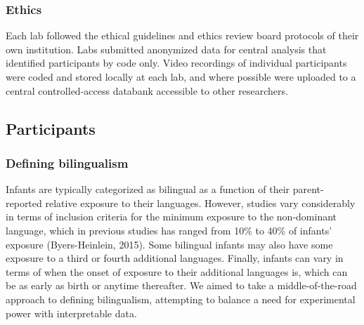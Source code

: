\documentclass[,man,floatsintext]{apa6}
\begin{document}
\hypertarget{ethics}{%
\subsubsection{Ethics}\label{ethics}}

Each lab followed the ethical guidelines and ethics review board protocols of their own institution. Labs submitted anonymized data for central analysis that identified participants by code only. Video recordings of individual participants were coded and stored locally at each lab, and where possible were uploaded to a central controlled-access databank accessible to other researchers.

\hypertarget{participants}{%
\subsection{Participants}\label{participants}}

\hypertarget{defining-bilingualism}{%
\subsubsection{Defining bilingualism}\label{defining-bilingualism}}

Infants are typically categorized as bilingual as a function of their parent-reported relative exposure to their languages. However, studies vary considerably in terms of inclusion criteria for the minimum exposure to the non-dominant language, which in previous studies has ranged from 10\% to 40\% of infants' exposure (Byers-Heinlein, 2015). Some bilingual infants may also have some exposure to a third or fourth additional languages. Finally, infants can vary in terms of when the onset of exposure to their additional languages is, which can be as early as birth or anytime thereafter. We aimed to take a middle-of-the-road approach to defining bilingualism, attempting to balance a need for experimental power with interpretable data.
\end{document}
